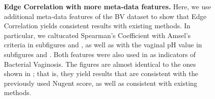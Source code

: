 
\begin{figure}[hpbt]
    \centering
    \begin{subfigure}{0pt}
        \label{fig:amsel_ph:sub:amsel_em}
    \end{subfigure}
    \begin{subfigure}{0pt}
        \label{fig:amsel_ph:sub:amsel_ei}
    \end{subfigure}
    \begin{subfigure}{0pt}
        \label{fig:amsel_ph:sub:ph_em}
    \end{subfigure}
    \begin{subfigure}{0pt}
        \label{fig:amsel_ph:sub:ph_ei}
    \end{subfigure}
    \caption[Edge Correlation with more meta-data features]{
        \textbf{Edge Correlation with more meta-data features.}
        Here, we use additional meta-data features of the \ac{BV} dataset
        to show that Edge Correlation yields consistent results with existing methods.
        In particular, we caltucated Spearman's Coefficient with Amsel's criteria \cite{Amsel1983}
        in subfigures  and ,
        as well as with the vaginal pH value
        in subfigures  and .
        Both features were also used in \cite{Srinivasan2012} as indicators of Bacterial Vaginosis.
        The figures are almost identical to the ones shown in ;
        that is, they yield results that are consistent with the previously used Nugent score,
        as well as consistent with existing methods.
    }
    \label{fig:amsel_ph}
\end{figure}


